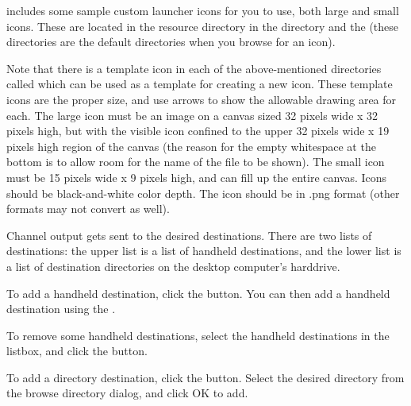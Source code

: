 \brandingapplicationdesktopname includes some sample custom launcher icons for 
you to use, both large and small icons. These are located in the 
\brandingapplicationdesktopname resource directory in the  directory
and the  (these directories are the default directories when
you browse for an icon). 

Note that there is a template icon in each of the above-mentioned directories called 
 which can be used as a template for creating a new icon. These 
template icons are the proper size, and use arrows to show the allowable drawing 
area for each. The large icon must be an image on a canvas sized 32 pixels wide x 32 pixels
high, but with the visible icon confined to the upper 32 pixels wide x 19
pixels high region of the canvas (the reason for the empty whitespace at the bottom is
to allow room for the name of the file to be shown). 
The small icon must be 15 pixels wide x 9 pixels high, and can fill up the entire canvas.
Icons should be black-and-white color depth. The icon should be in .png format 
(other formats may not convert as well).


Channel output gets sent to the desired destinations. There are two lists of
destinations: the upper list is a list of handheld destinations, and the lower
list is a list of destination directories on the desktop computer's harddrive.

To add a handheld destination, click the 
button. You can then add a handheld destination using the
\helpignore{\ref{sec:pd-handheld-dest-dialog}}
.

To remove some handheld destinations, select the handheld destinations in the 
listbox, and click the  button.

To add a directory destination, click the 
 button. Select the desired directory 
from the browse directory dialog, and click OK to add.

